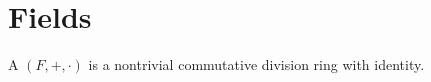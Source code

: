 \section{Fields}\label{sec:fields}

\begin{definition}\label{def:field}
  A  \( (F, +, \cdot) \) is a nontrivial commutative division ring with identity.
\end{definition}
